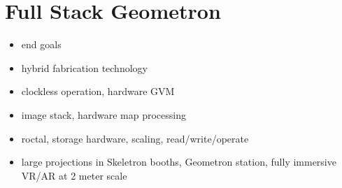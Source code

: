 \section{Full Stack Geometron}
\begin{itemize}
\tightlist
\item
end goals
\item
hybrid fabrication technology
\item
clockless operation, hardware GVM
\item
image stack, hardware map processing
\item
roctal, storage hardware, scaling, read/write/operate
\item
large projections in Skeletron booths, Geometron station, fully immersive VR/AR at 2 meter scale
\end{itemize}